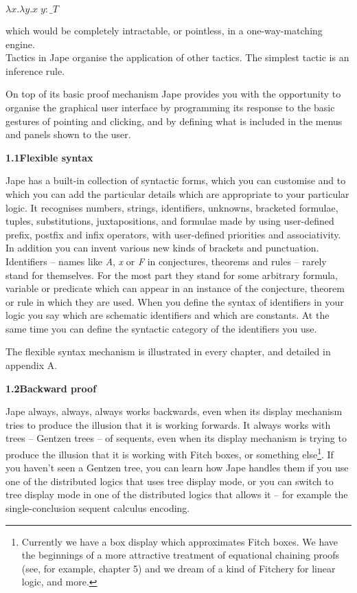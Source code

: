 \documentclass[11pt]{book}
\newcommand{\tab}{\hspace{5mm}}
\begin{document}
$\lambda x.\lambda y.x\;y:\_T$

which would be completely intractable, or pointless, in a one-way-matching engine.\\
Tactics in Jape organise the application of other tactics. The simplest tactic is an inference rule.


On top of its basic proof mechanism Jape provides you with the opportunity to organise the graphical user interface by programming its response to the basic gestures of pointing and clicking, and by defining what is included in the menus and panels shown to the user.


\textbf{{\large 1.1\tab Flexible syntax}}


Jape has a built-in collection of syntactic forms, which you can customise and to which you can add the particular details which are appropriate to your particular logic. It recognises numbers, strings, identifiers, unknowns, bracketed formulae, tuples, substitutions, juxtapositions, and formulae made by using user-defined prefix, postfix and infix operators, with user-defined priorities and associativity. In addition you can invent various new kinds of brackets and punctuation.\\
Identifiers -- names like \textit{A}, \textit{x} or \textit{F} in conjectures, theorems and rules -- rarely stand for themselves. For the most part they stand for some arbitrary formula, variable or predicate which can appear in an instance of the conjecture, theorem or rule in which they are used. When you define the syntax of identifiers in your logic you say which are schematic identifiers and which are constants. At the same time you can define the syntactic category of the identifiers you use.


The flexible syntax mechanism is illustrated in every chapter, and detailed in appendix A.


\textbf{{\large 1.2\tab Backward proof}}


Jape always, always, always works backwards, even when its display mechanism tries to produce the illusion that it is working forwards. It always works with trees -- Gentzen trees -- of sequents, even when its display mechanism is trying to produce the illusion that it is working with Fitch boxes, or something else\footnote{Currently we have a box display which approximates Fitch boxes. We have the beginnings of a more attractive treatment of equational chaining proofs (see, for example, chapter 5) and we dream of a kind of Fitchery for linear logic, and more.}. If you haven't seen a Gentzen tree, you can learn how Jape handles them if you use one of the distributed logics that uses tree display mode, or you can switch to tree display mode in one of the distributed logics that allows it -- for example the single-conclusion sequent calculus encoding.
\end{document}

